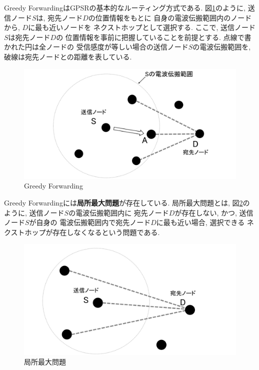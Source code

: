 Greedy ForwardingはGPSRの基本的なルーティング方式である.
図\ref{fig:greedy}のように, 送信ノード$S$は, 宛先ノード$D$の位置情報をもとに
自身の電波伝搬範囲内のノードから, $D$に最も近いノードを
ネクストホップとして選択する. ここで, 送信ノード$S$は宛先ノード$D$の
位置情報を事前に把握していることを前提とする. 点線で書かれた円は全ノードの
受信感度が等しい場合の送信ノード$S$の電波伝搬範囲を, 
破線は宛先ノードとの距離を表している.

\begin{figure}
  \centering
  \includegraphics[scale=0.7]{figures/greedy.png}
  \caption{Greedy Forwarding}
  \label{fig:greedy}
\end{figure}

Greedy Forwardingには\textbf{局所最大問題}が存在している. 
局所最大問題とは, 図\ref{fig:local}のように, 送信ノード$S$の電波伝搬範囲内に
宛先ノード$D$が存在しない, かつ, 送信ノード$S$が自身の
電波伝搬範囲内で宛先ノード$D$に最も近い場合, 選択できる
ネクストホップが存在しなくなるという問題である.

\begin{figure}
  \centering
  \includegraphics[scale=0.6]{figures/local.png}
  \caption{局所最大問題}
  \label{fig:local}
\end{figure}
